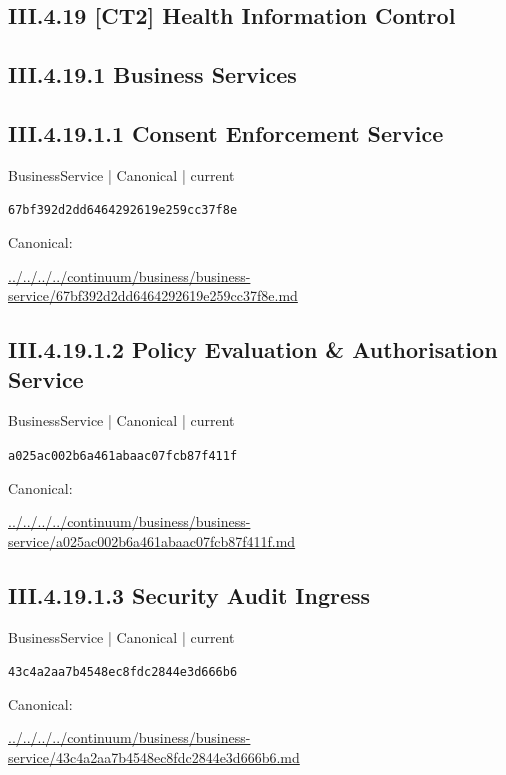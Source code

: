 \documentclass[10pt,a4paper]{article}
\begin{document}
\subsection*{III.4.19 [CT2] Health Information Control}
\subsection*{III.4.19.1 Business Services}
\subsection*{III.4.19.1.1 Consent Enforcement Service}
{\small BusinessService | Canonical | current}\par
\texttt{67bf392d2dd6464292619e259cc37f8e}\par
Canonical: \par
{\footnotesize\url{../../../../continuum/business/business-service/67bf392d2dd6464292619e259cc37f8e.md}}\par
\subsection*{III.4.19.1.2 Policy Evaluation \& Authorisation Service}
{\small BusinessService | Canonical | current}\par
\texttt{a025ac002b6a461abaac07fcb87f411f}\par
Canonical: \par
{\footnotesize\url{../../../../continuum/business/business-service/a025ac002b6a461abaac07fcb87f411f.md}}\par
\subsection*{III.4.19.1.3 Security Audit Ingress}
{\small BusinessService | Canonical | current}\par
\texttt{43c4a2aa7b4548ec8fdc2844e3d666b6}\par
Canonical: \par
{\footnotesize\url{../../../../continuum/business/business-service/43c4a2aa7b4548ec8fdc2844e3d666b6.md}}\par
\end{document}
